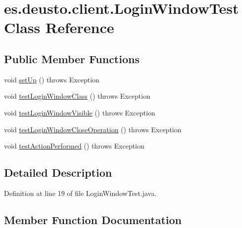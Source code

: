 \hypertarget{classes_1_1deusto_1_1client_1_1_login_window_test}{}\section{es.\+deusto.\+client.\+Login\+Window\+Test Class Reference}
\label{classes_1_1deusto_1_1client_1_1_login_window_test}
\subsection*{Public Member Functions}
\begin{DoxyCompactItemize}
\item 
void \hyperlink{classes_1_1deusto_1_1client_1_1_login_window_test_a933acf800aa9a00a3434d7e52d36cdc7}{set\+Up} ()  throws Exception 
\item 
void \hyperlink{classes_1_1deusto_1_1client_1_1_login_window_test_ac359eac8035197bd00b65f34d5e74c29}{test\+Login\+Window\+Class} ()  throws Exception 
\item 
void \hyperlink{classes_1_1deusto_1_1client_1_1_login_window_test_af3a9c3aab7052bc279bd98b5f34dc574}{test\+Login\+Window\+Visible} ()  throws Exception 
\item 
void \hyperlink{classes_1_1deusto_1_1client_1_1_login_window_test_a65a992d1184421c2aff6afaf3cedbe7c}{test\+Login\+Window\+Close\+Operation} ()  throws Exception 
\item 
void \hyperlink{classes_1_1deusto_1_1client_1_1_login_window_test_a404ca444c6d5f9e57ddd9999e4f0c982}{test\+Action\+Performed} ()  throws Exception 
\end{DoxyCompactItemize}


\subsection{Detailed Description}


Definition at line 19 of file Login\+Window\+Test.\+java.



\subsection{Member Function Documentation}
\mbox{\label{classes_1_1deusto_1_1client_1_1_login_window_test_a933acf800aa9a00a3434d7e52d36cdc7}} 
